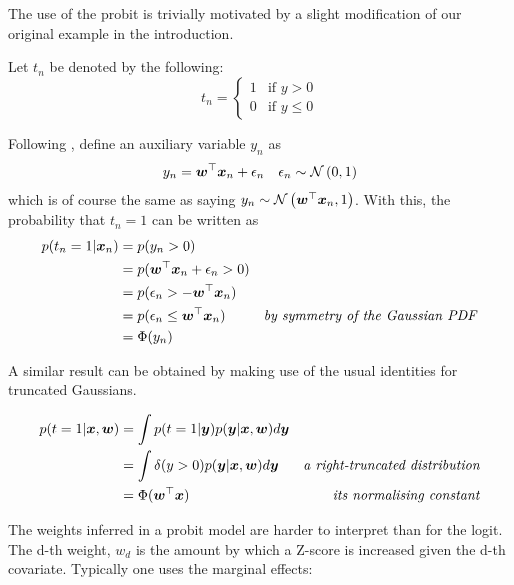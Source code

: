 The use of the probit is trivially motivated by a slight modification of our original example in the introduction.

Let $t_n$ be denoted by the following:
\begin{equation}
    t_n = \left\{ \begin{matrix}
        1 & \text{if } y > 0 \\
        0 & \text{if } y \leq 0
    \end{matrix} \right.
\end{equation}


Following \cite{AlbertChib1993}, define an auxiliary variable $y_n$ as
\begin{align}
y_n & = \bm w^\top \bm x_n + \epsilon_n & \epsilon_n \sim \mathcal{N} \left( {0}, {1} \right)
\end{align}
which is of course the same as saying $y_n \sim \mathcal{N} \left( {\bm w^\top\bm x_n}, {1} \right)$. With this, the probability that $t_n = 1$ can be written as
\begin{align}
p(t_n = 1 | \bm x_n) & = p (y_n > 0) \\
& = p(\bm w^\top\bm x_n + \epsilon_n > 0) \\
& = p(\epsilon_n > - \bm w^\top\bm x_n) \\
& = p(\epsilon_n \leq \bm w^\top\bm x_n) & \text{\emph{by symmetry of the Gaussian PDF}} \\
& = \Phi(y_n)
\end{align}

A similar result can be obtained by making use of the usual identities for truncated Gaussians.

\begin{align}
p(t = 1 | \bm x, \bm w) & = \int p(t = 1 | \bm y) p(\bm y | \bm x, \bm w) d\bm y \\
 & = \int \delta(y > 0) p(\bm y | \bm x, \bm w) d\bm y & \text{\emph{a right-truncated distribution}} \\
 & = \Phi(\bm w^\top\bm x) & \text{\emph{its normalising constant}}
\end{align}


The weights inferred in a probit model are harder to interpret than for the logit. The d-th weight, $w_d$ is the amount by which a Z-score is increased given the d-th covariate. Typically one uses the marginal effects:

